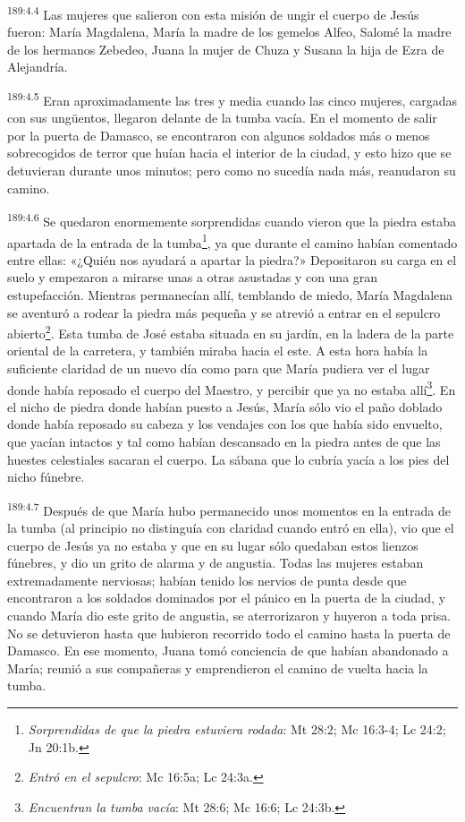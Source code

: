 \par
\textsuperscript{189:4.4} Las mujeres que salieron con esta misión de ungir el cuerpo de Jesús fueron: María Magdalena, María la madre de los gemelos Alfeo, Salomé la madre de los hermanos Zebedeo, Juana la mujer de Chuza y Susana la hija de Ezra de Alejandría.

\par
\textsuperscript{189:4.5} Eran aproximadamente las tres y media cuando las cinco mujeres, cargadas con sus ung\"uentos, llegaron delante de la tumba vacía. En el momento de salir por la puerta de Damasco, se encontraron con algunos soldados más o menos sobrecogidos de terror que huían hacia el interior de la ciudad, y esto hizo que se detuvieran durante unos minutos; pero como no sucedía nada más, reanudaron su camino.

\par
\textsuperscript{189:4.6} Se quedaron enormemente sorprendidas cuando vieron que la piedra estaba apartada de la entrada de la tumba\footnote{\textit{Sorprendidas de que la piedra estuviera rodada}: Mt 28:2; Mc 16:3-4; Lc 24:2; Jn 20:1b.}, ya que durante el camino habían comentado entre ellas: «¿Quién nos ayudará a apartar la piedra?» Depositaron su carga en el suelo y empezaron a mirarse unas a otras asustadas y con una gran estupefacción. Mientras permanecían allí, temblando de miedo, María Magdalena se aventuró a rodear la piedra más pequeña y se atrevió a entrar en el sepulcro abierto\footnote{\textit{Entró en el sepulcro}: Mc 16:5a; Lc 24:3a.}. Esta tumba de José estaba situada en su jardín, en la ladera de la parte oriental de la carretera, y también miraba hacia el este. A esta hora había la suficiente claridad de un nuevo día como para que María pudiera ver el lugar donde había reposado el cuerpo del Maestro, y percibir que ya no estaba allí\footnote{\textit{Encuentran la tumba vacía}: Mt 28:6; Mc 16:6; Lc 24:3b.}. En el nicho de piedra donde habían puesto a Jesús, María sólo vio el paño doblado donde había reposado su cabeza y los vendajes con los que había sido envuelto, que yacían intactos y tal como habían descansado en la piedra antes de que las huestes celestiales sacaran el cuerpo. La sábana que lo cubría yacía a los pies del nicho fúnebre.

\par
\textsuperscript{189:4.7} Después de que María hubo permanecido unos momentos en la entrada de la tumba (al principio no distinguía con claridad cuando entró en ella), vio que el cuerpo de Jesús ya no estaba y que en su lugar sólo quedaban estos lienzos fúnebres, y dio un grito de alarma y de angustia. Todas las mujeres estaban extremadamente nerviosas; habían tenido los nervios de punta desde que encontraron a los soldados dominados por el pánico en la puerta de la ciudad, y cuando María dio este grito de angustia, se aterrorizaron y huyeron a toda prisa. No se detuvieron hasta que hubieron recorrido todo el camino hasta la puerta de Damasco. En ese momento, Juana tomó conciencia de que habían abandonado a María; reunió a sus compañeras y emprendieron el camino de vuelta hacia la tumba.

